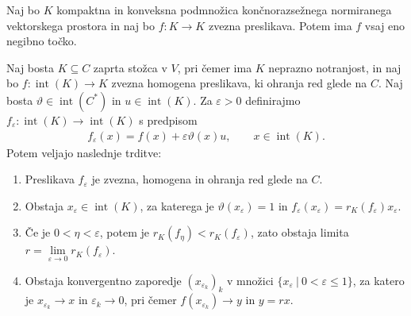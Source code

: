 \documentclass[mat2, tisk]{fmfdelo}
\begin{document}
\begin{izrek}\label{Brouwer}
  Naj bo $K$ kompaktna in konveksna podmnožica končnorazsežnega normiranega vektorskega prostora 
  in naj bo $f:K\to K$ zvezna preslikava. Potem ima $f$ vsaj eno negibno točko.
\end{izrek}

\begin{izrek}\label{izr:obstoj_lastnega_vektorja_perturbacija}
  Naj bosta $K\subseteq C$ zaprta stožca v $V$, pri čemer ima $K$
  neprazno notranjost, in naj bo
  $f\colon\operatorname{int}(K)\longrightarrow K$ zvezna homogena
  preslikava, ki ohranja red glede na $C$. Naj bosta
  $\vartheta\in\operatorname{int}(C^*)$ in
  $u\in\operatorname{int}(K)$. Za $\varepsilon>0$ definirajmo
  $f_\varepsilon\colon\operatorname{int}(K)\longrightarrow
  \operatorname{int}(K)$ s predpisom
  \begin{align*}
  f_\varepsilon(x)
  =
  f(x)+\varepsilon\vartheta(x)u,
  \qquad
  x\in\operatorname{int}(K).
  \end{align*}
  Potem veljajo naslednje trditve:
  \begin{enumerate}[label=(\roman*)]
  \item Preslikava $f_\varepsilon$ je zvezna, homogena in ohranja red
  glede na $C$.

  \item Obstaja $x_\varepsilon\in\operatorname{int}(K)$, za katerega je
  $\vartheta(x_\varepsilon)=1$ in
  $f_\varepsilon(x_\varepsilon)
  =r_K(f_\varepsilon)x_\varepsilon$.

  \item Če je $0<\eta<\varepsilon$, potem je
  $r_K(f_\eta)<r_K(f_\varepsilon)$, zato obstaja limita
  $r=\lim\limits_{\varepsilon\to0}r_K(f_\varepsilon)$.

  \item Obstaja konvergentno zaporedje $(x_{\varepsilon_k})_k$ v množici
  $\{x_\varepsilon ~|~0<\varepsilon\leq1\}$, za katero je
  $x_{\varepsilon_k}\longrightarrow x$ in
  $\varepsilon_k\longrightarrow0$, pri čemer
  $f(x_{\varepsilon_k})\longrightarrow y$ in $y=rx$.
  \end{enumerate}
\end{izrek}
\end{document}
